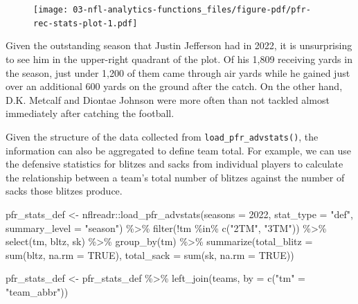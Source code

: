 \documentclass[
  letterpaper,
]{krantz}
\newenvironment{Shaded}{\begin{snugshade}}{\end{snugshade}}
\newcommand{\AttributeTok}[1]{\textcolor[rgb]{0.40,0.45,0.13}{#1}}
\newcommand{\ConstantTok}[1]{\textcolor[rgb]{0.56,0.35,0.01}{#1}}
\newcommand{\DecValTok}[1]{\textcolor[rgb]{0.68,0.00,0.00}{#1}}
\newcommand{\FunctionTok}[1]{\textcolor[rgb]{0.28,0.35,0.67}{#1}}
\newcommand{\NormalTok}[1]{\textcolor[rgb]{0.00,0.23,0.31}{#1}}
\newcommand{\OtherTok}[1]{\textcolor[rgb]{0.00,0.23,0.31}{#1}}
\newcommand{\SpecialCharTok}[1]{\textcolor[rgb]{0.37,0.37,0.37}{#1}}
\newcommand{\StringTok}[1]{\textcolor[rgb]{0.13,0.47,0.30}{#1}}
\begin{document}
\begin{figure}[H]

{\centering \texttt{[image: 03-nfl-analytics-functions\_files/figure-pdf/pfr-rec-stats-plot-1.pdf]}

}

\end{figure}

Given the outstanding season that Justin Jefferson had in 2022, it is
unsurprising to see him in the upper-right quadrant of the plot. Of his
1,809 receiving yards in the season, just under 1,200 of them came
through air yards while he gained just over an additional 600 yards on
the ground after the catch. On the other hand, D.K. Metcalf and Diontae
Johnson were more often than not tackled almost immediately after
catching the football.

Given the structure of the data collected from
\texttt{load\_pfr\_advstats()}, the information can also be aggregated
to define team total. For example, we can use the defensive statistics
for blitzes and sacks from individual players to calculate the
relationship between a team's total number of blitzes against the number
of sacks those blitzes produce.

\begin{Shaded}
\begin{Highlighting}[]
\NormalTok{pfr\_stats\_def }\OtherTok{\textless{}{-}}\NormalTok{ nflreadr}\SpecialCharTok{::}\FunctionTok{load\_pfr\_advstats}\NormalTok{(}\AttributeTok{seasons =} \DecValTok{2022}\NormalTok{,}
                                             \AttributeTok{stat\_type =} \StringTok{"def"}\NormalTok{,}
                                             \AttributeTok{summary\_level =} \StringTok{"season"}\NormalTok{) }\SpecialCharTok{\%\textgreater{}\%}
  \FunctionTok{filter}\NormalTok{(}\SpecialCharTok{!}\NormalTok{tm }\SpecialCharTok{\%in\%} \FunctionTok{c}\NormalTok{(}\StringTok{"2TM"}\NormalTok{, }\StringTok{"3TM"}\NormalTok{)) }\SpecialCharTok{\%\textgreater{}\%}
  \FunctionTok{select}\NormalTok{(tm, bltz, sk) }\SpecialCharTok{\%\textgreater{}\%}
  \FunctionTok{group\_by}\NormalTok{(tm) }\SpecialCharTok{\%\textgreater{}\%}
  \FunctionTok{summarize}\NormalTok{(}\AttributeTok{total\_blitz =} \FunctionTok{sum}\NormalTok{(bltz, }\AttributeTok{na.rm =} \ConstantTok{TRUE}\NormalTok{),}
            \AttributeTok{total\_sack =} \FunctionTok{sum}\NormalTok{(sk, }\AttributeTok{na.rm =} \ConstantTok{TRUE}\NormalTok{))}

\NormalTok{pfr\_stats\_def }\OtherTok{\textless{}{-}}\NormalTok{ pfr\_stats\_def }\SpecialCharTok{\%\textgreater{}\%}
  \FunctionTok{left\_join}\NormalTok{(teams, }\AttributeTok{by =} \FunctionTok{c}\NormalTok{(}\StringTok{"tm"} \OtherTok{=} \StringTok{"team\_abbr"}\NormalTok{))}
\end{Highlighting}
\end{Shaded}
\end{document}
